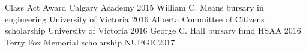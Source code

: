 \begin{cvhonors}
  \cvhonor
    {Class Act Award }
    {Calgary Academy}
    {}
    {2015}
  \cvhonor
    {William C. Means bursary in engineering }
    {University of Victoria}
    {}
    {2016}
  \cvhonor
    {Alberta Committee of Citizens scholarship}
    {University of Victoria}
    {}
    {2016}
  \cvhonor
    {George C. Hall bursary fund}
    {HSAA}
    {}
    {2016}
  \cvhonor
    {Terry Fox Memorial scholarship}
    {NUPGE}
    {}
    {2017}
\end{cvhonors}
